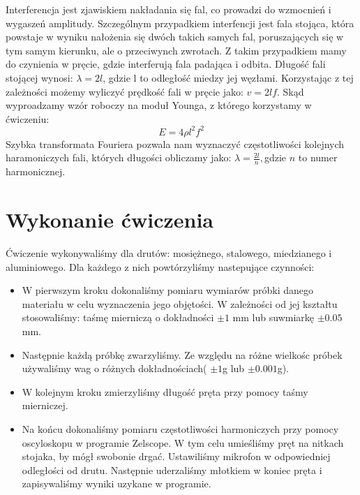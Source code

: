 \documentclass [a4paper,11pt]{article}
\begin{document}
	Interferencja jest zjawiskiem nakładania się fal, co prowadzi do wzmocnień i wygaszeń amplitudy. Szczególnym przypadkiem interfencji jest fala stojąca, która powstaje w wyniku nałożenia się dwóch takich samych fal, poruszających się w tym samym kierunku, ale o przeciwynch zwrotach. Z takim przypadkiem mamy do czynienia w pręcie, gdzie interferują fala padająca i odbita. Długość fali stojącej wynosi: $\lambda = 2l$, gdzie l to odległość miedzy jej węzłami.
	Korzystając z tej zależności możemy wyliczyć prędkość fali w pręcie jako: $v = 2lf$.
	Skąd wyproadzamy wzór roboczy na moduł Younga, z którego korzystamy w ćwiczeniu:
	\begin{equation}
		E = 4\rho l^2 f^2
	\end{equation}
	Szybka transformata Fouriera pozwala nam wyznaczyć częstotliwości kolejnych haramoniczych fali, których długości obliczamy jako: $\lambda=\frac{2l}{n},$gdzie $n$ to numer harmonicznej.
	
	
	\section{Wykonanie ćwiczenia}
	Ćwiczenie wykonywaliśmy dla drutów: mosiężnego, stalowego, miedzianego i aluminiowego. Dla każdego z nich powtórzyliśmy nastepujące czynności:
	\begin{itemize}
		\item W pierwszym kroku dokonaliśmy pomiaru wymiarów próbki danego materiału w celu wyznaczenia jego objętości. W zależności od jej kształtu stosowaliśmy: taśmę mierniczą o dokładności $\pm1$ mm lub suwmiarkę $\pm0.05$ mm.
		\item Następnie każdą próbkę zwarzyliśmy. Ze względu na różne wielkośc próbek używaliśmy wag o różnych dokładnościach( $\pm1$g lub $\pm0.001$g).
		
		\item W kolejnym kroku zmierzyliśmy długość pręta przy pomocy taśmy mierniczej.
		
		\item Na końcu dokonaliśmy pomiaru częstotliwości harmoniczych przy pomocy oscyloskopu w programie Zelscope. W tym celu umieśliśmy pręt na nitkach stojaka, by mógł swobonie drgać. Ustawiliśmy mikrofon w odpowiedniej odległości od drutu. Następnie uderzaliśmy młotkiem w koniec pręta i zapisywaliśmy wyniki uzykane w programie.  
	\end{itemize}
\end{document}
